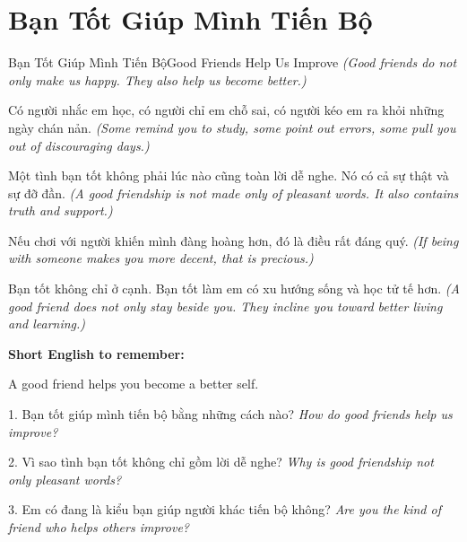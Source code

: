 \section{Bạn Tốt Giúp Mình Tiến Bộ}
\begin{truyen}{Bạn Tốt Giúp Mình Tiến Bộ}{Good Friends Help Us Improve}
\textit{(Good friends do not only make us happy. They also help us become better.)}

Có người nhắc em học, có người chỉ em chỗ sai, có người kéo em ra khỏi những ngày chán nản.
\textit{(Some remind you to study, some point out errors, some pull you out of discouraging days.)}

Một tình bạn tốt không phải lúc nào cũng toàn lời dễ nghe. Nó có cả sự thật và sự đỡ đần.
\textit{(A good friendship is not made only of pleasant words. It also contains truth and support.)}

Nếu chơi với người khiến mình đàng hoàng hơn, đó là điều rất đáng quý.
\textit{(If being with someone makes you more decent, that is precious.)}
\end{truyen}

\begin{baihoc}
Bạn tốt không chỉ ở cạnh. Bạn tốt làm em có xu hướng sống và học tử tế hơn.
\textit{(A good friend does not only stay beside you. They incline you toward better living and learning.)}
\end{baihoc}

\begin{ghinhoanh}
\textbf{Short English to remember:}

A good friend helps you become a better self.

\end{ghinhoanh}

\begin{tuhocnhanh}
1. Bạn tốt giúp mình tiến bộ bằng những cách nào? \textit{How do good friends help us improve?}

2. Vì sao tình bạn tốt không chỉ gồm lời dễ nghe? \textit{Why is good friendship not only pleasant words?}

3. Em có đang là kiểu bạn giúp người khác tiến bộ không? \textit{Are you the kind of friend who helps others improve?}
\end{tuhocnhanh}
\ngancach

